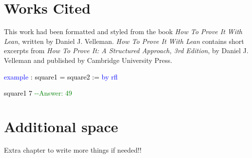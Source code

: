 \documentclass[
  letterpaper,
]{scrreprt}
\makeatletter
\newenvironment{Shaded}{\begin{snugshade}}{\end{snugshade}}
\newcommand{\CommentTok}[1]{\textcolor[rgb]{0.37,0.37,0.37}{#1}}
\newcommand{\DocumentationTok}[1]{\textcolor[rgb]{0.37,0.37,0.37}{\textit{#1}}}
\newcommand{\KeywordTok}[1]{\textcolor[rgb]{0.00,0.23,0.31}{#1}}
\newcommand{\NormalTok}[1]{\textcolor[rgb]{0.00,0.23,0.31}{#1}}
\newcommand{\SpecialCharTok}[1]{\textcolor[rgb]{0.37,0.37,0.37}{#1}}
\def\bluesquiggly{\bgroup \markoverwith{\textcolor[HTML]{1E90FF}{\lower3.5\p@\hbox{\sixly \char58}}}\ULon}
\renewcommand{\NormalTok}[1]{\textcolor[HTML]{000000}{#1}}
\renewcommand{\KeywordTok}[1]{\textcolor[HTML]{0000FF}{#1}}
\renewcommand{\SpecialCharTok}[1]{}
\renewcommand{\CommentTok}[1]{\textcolor[HTML]{008000}{#1}}
\renewcommand{\DocumentationTok}[1]{\bluesquiggly{\textcolor[HTML]{0000FF}{#1}}}
\theoremstyle{remark}
\makeatother
\begin{document}

\hypertarget{works-cited}{%
\chapter{Works Cited}\label{works-cited}}

This work had been formatted and styled from the book \emph{How To Prove
It With Lean}, written by Daniel J. Velleman. \emph{How To Prove It With
Lean} contains short excerpts from \emph{How To Prove It: A Structured
Approach, 3rd Edition}, by Daniel J. Velleman and published by Cambridge
University Press.

\begin{Shaded}
\begin{Highlighting}[]
\KeywordTok{example}\NormalTok{ : square1 = square2 := }\KeywordTok{by} \KeywordTok{rfl}

\SpecialCharTok{++}\DocumentationTok{\#eval}\SpecialCharTok{::}\NormalTok{ square1 7     }\CommentTok{{-}{-}Answer: 49}
\end{Highlighting}
\end{Shaded}


\hypertarget{additional-space}{%
\chapter{Additional space}\label{additional-space}}

Extra chapter to write more things if needed!!
\end{document}
